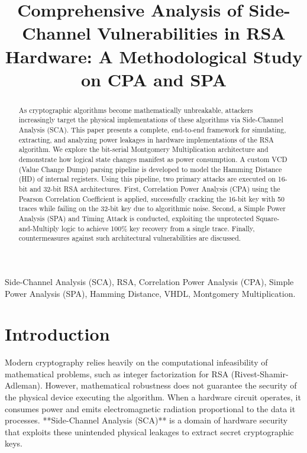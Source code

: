 \documentclass[conference, a4paper]{IEEEtran}
\begin{document}
\title{Comprehensive Analysis of Side-Channel Vulnerabilities in RSA Hardware: A Methodological Study on CPA and SPA}

\author{
}

\maketitle

\begin{abstract}
As cryptographic algorithms become mathematically unbreakable, attackers increasingly target the physical implementations of these algorithms via Side-Channel Analysis (SCA). This paper presents a complete, end-to-end framework for simulating, extracting, and analyzing power leakages in hardware implementations of the RSA algorithm. We explore the bit-serial Montgomery Multiplication architecture and demonstrate how logical state changes manifest as power consumption. A custom VCD (Value Change Dump) parsing pipeline is developed to model the Hamming Distance (HD) of internal registers. Using this pipeline, two primary attacks are executed on 16-bit and 32-bit RSA architectures. First, Correlation Power Analysis (CPA) using the Pearson Correlation Coefficient is applied, successfully cracking the 16-bit key with 50 traces while failing on the 32-bit key due to algorithmic noise. Second, a Simple Power Analysis (SPA) and Timing Attack is conducted, exploiting the unprotected Square-and-Multiply logic to achieve 100\% key recovery from a single trace. Finally, countermeasures against such architectural vulnerabilities are discussed.
\end{abstract}

\begin{IEEEkeywords}
Side-Channel Analysis (SCA), RSA, Correlation Power Analysis (CPA), Simple Power Analysis (SPA), Hamming Distance, VHDL, Montgomery Multiplication.
\end{IEEEkeywords}

\section{Introduction}
Modern cryptography relies heavily on the computational infeasibility of mathematical problems, such as integer factorization for RSA (Rivest-Shamir-Adleman). However, mathematical robustness does not guarantee the security of the physical device executing the algorithm. When a hardware circuit operates, it consumes power and emits electromagnetic radiation proportional to the data it processes. **Side-Channel Analysis (SCA)** is a domain of hardware security that exploits these unintended physical leakages to extract secret cryptographic keys.
\end{document}
